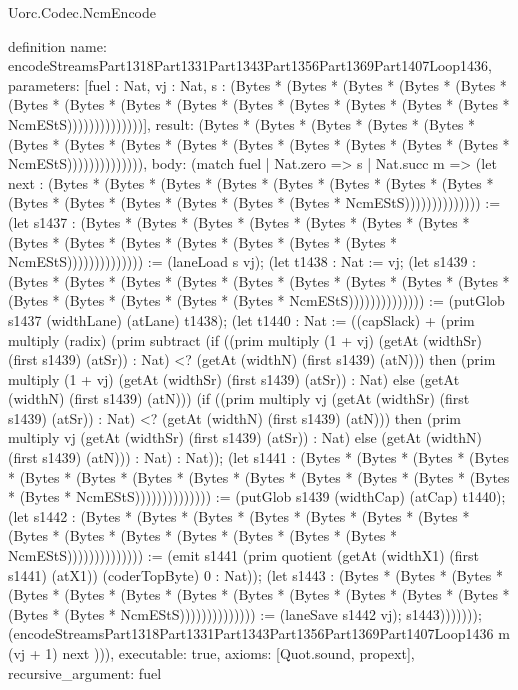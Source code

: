 \begin{lexlean}{Uorc.Codec.NcmEncode}
\begin{semanticmodule}
definition{
  name: encodeStreamsPart1318Part1331Part1343Part1356Part1369Part1407Loop1436,
  parameters: [fuel : Nat, vj : Nat, s : (Bytes * (Bytes * (Bytes * (Bytes * (Bytes * (Bytes * (Bytes * (Bytes * (Bytes * (Bytes * (Bytes * (Bytes * (Bytes * (Bytes * NcmEStS))))))))))))))],
  result: (Bytes * (Bytes * (Bytes * (Bytes * (Bytes * (Bytes * (Bytes * (Bytes * (Bytes * (Bytes * (Bytes * (Bytes * (Bytes * (Bytes * NcmEStS)))))))))))))),
  body: (match fuel
    | Nat.zero => s
    | Nat.succ m => (let next : (Bytes * (Bytes * (Bytes * (Bytes * (Bytes * (Bytes * (Bytes * (Bytes * (Bytes * (Bytes * (Bytes * (Bytes * (Bytes * (Bytes * NcmEStS)))))))))))))) := (let s1437 : (Bytes * (Bytes * (Bytes * (Bytes * (Bytes * (Bytes * (Bytes * (Bytes * (Bytes * (Bytes * (Bytes * (Bytes * (Bytes * (Bytes * NcmEStS)))))))))))))) := (laneLoad s vj); (let t1438 : Nat := vj; (let s1439 : (Bytes * (Bytes * (Bytes * (Bytes * (Bytes * (Bytes * (Bytes * (Bytes * (Bytes * (Bytes * (Bytes * (Bytes * (Bytes * (Bytes * NcmEStS)))))))))))))) := (putGlob s1437 (widthLane) (atLane) t1438); (let t1440 : Nat := ((capSlack) + (prim multiply (radix) (prim subtract (if ((prim multiply (1 + vj) (getAt (widthSr) (first s1439) (atSr)) : Nat) <? (getAt (widthN) (first s1439) (atN))) then (prim multiply (1 + vj) (getAt (widthSr) (first s1439) (atSr)) : Nat) else (getAt (widthN) (first s1439) (atN))) (if ((prim multiply vj (getAt (widthSr) (first s1439) (atSr)) : Nat) <? (getAt (widthN) (first s1439) (atN))) then (prim multiply vj (getAt (widthSr) (first s1439) (atSr)) : Nat) else (getAt (widthN) (first s1439) (atN))) : Nat) : Nat)); (let s1441 : (Bytes * (Bytes * (Bytes * (Bytes * (Bytes * (Bytes * (Bytes * (Bytes * (Bytes * (Bytes * (Bytes * (Bytes * (Bytes * (Bytes * NcmEStS)))))))))))))) := (putGlob s1439 (widthCap) (atCap) t1440); (let s1442 : (Bytes * (Bytes * (Bytes * (Bytes * (Bytes * (Bytes * (Bytes * (Bytes * (Bytes * (Bytes * (Bytes * (Bytes * (Bytes * (Bytes * NcmEStS)))))))))))))) := (emit s1441 (prim quotient (getAt (widthX1) (first s1441) (atX1)) (coderTopByte) 0 : Nat)); (let s1443 : (Bytes * (Bytes * (Bytes * (Bytes * (Bytes * (Bytes * (Bytes * (Bytes * (Bytes * (Bytes * (Bytes * (Bytes * (Bytes * (Bytes * NcmEStS)))))))))))))) := (laneSave s1442 vj); s1443))))))); (encodeStreamsPart1318Part1331Part1343Part1356Part1369Part1407Loop1436 m (vj + 1) next ))),
  executable: true,
  axioms: [Quot.sound, propext],
  recursive_argument: fuel
}


\end{semanticmodule}
\end{lexlean}
